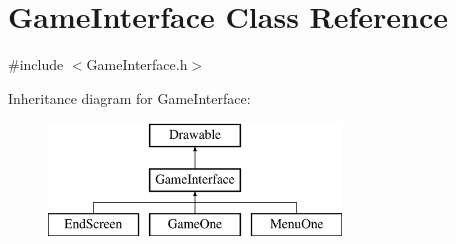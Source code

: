 \hypertarget{class_game_interface}{}\section{Game\+Interface Class Reference}
\label{class_game_interface}


{\ttfamily \#include $<$Game\+Interface.\+h$>$}

Inheritance diagram for Game\+Interface\+:\begin{figure}[H]
\begin{center}
\leavevmode
\includegraphics[height=3.000000cm]{class_game_interface}
\end{center}
\end{figure}
